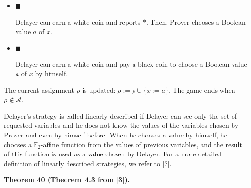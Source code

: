 \documentclass[10pt,a4paper]{article}
\begin{document}
\begin{itemize}


\item 
$\blacksquare$ 


Delayer can earn a white coin and reports $*$. Then, Prover chooses a Boolean value $a$ of $x$.\par





\item 
$\blacksquare$ 


Delayer can earn a white coin and pay a black coin to choose a Boolean value $a$ of $x$ by himself.\par





\end{itemize}


The current assignment $\rho$ is updated: $\rho:=\rho\cup\{x:=a\}$. The game ends when $\rho\notin\mathcal{A}$.\par



Delayer’s strategy is called linearly described if Delayer can see only the set of requested variables and he does not know the values of the variables chosen by Prover and even by himself before. When he chooses a value by himself, he chooses a $\mathbb{F}_{2}$-affine function from the values of previous variables, and the result of this function is used as a value chosen by Delayer. For a more detailed definition of linearly described strategies, we refer to [3].\par



\par\medskip\noindent\textbf{
Theorem 40 (Theorem 4.3 from [3]).
}\par
\end{document}
